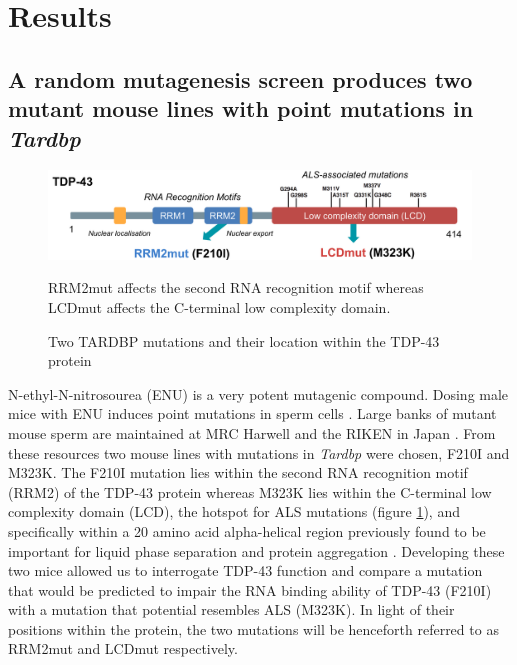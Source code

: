 \section{Results}

\subsection{A random mutagenesis screen produces two mutant mouse lines with point mutations in \textit{Tardbp}}

\begin{figure}[h!]
		\centering
		\includegraphics[scale=0.6]{Figures/05_tdp_mice/TDP_structure_mutations.png}
	\caption{Two TARDBP mutations and their location within the TDP-43 protein}
	RRM2mut affects the second RNA recognition motif whereas LCDmut affects the C-terminal low complexity domain.
	\label{fig:tdp_structure}
\end{figure}

N-ethyl-N-nitrosourea (ENU) is a very potent mutagenic compound. Dosing male mice with ENU induces point mutations in sperm cells \citep{DeAngelis2000}. Large banks of mutant mouse sperm are maintained at MRC Harwell \citep{Acevedo2008} and the RIKEN in Japan \citep{Gondo2010}. From these resources two mouse lines with mutations in \textit{Tardbp} were chosen, F210I and M323K. The F210I mutation lies within the second RNA recognition motif (RRM2) of the TDP-43 protein whereas M323K lies within the C-terminal low complexity domain (LCD), the hotspot for ALS mutations (figure \ref{fig:tdp_structure}), and specifically within a 20 amino acid alpha-helical region previously found to be important for liquid phase separation and protein aggregation \citep{Conicella2016}. Developing these two mice allowed us to interrogate TDP-43 function and compare a mutation that would be predicted to impair the RNA binding ability of TDP-43 (F210I) with a mutation that potential resembles ALS (M323K). In light of their positions within the protein, the two mutations will be henceforth referred to as RRM2mut and LCDmut respectively.


